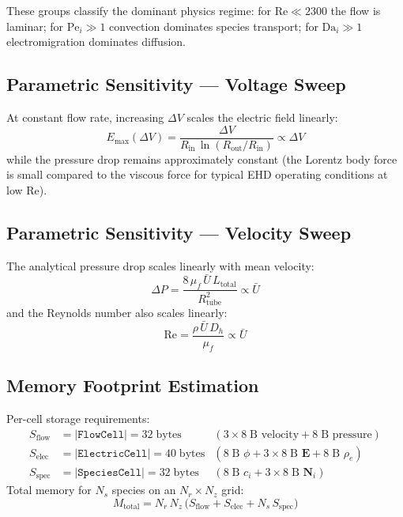 \documentclass[11pt,a4paper]{article}
\begin{document}
These groups classify the dominant physics regime: for $\mathrm{Re} \ll 2300$
the flow is laminar; for $\mathrm{Pe}_i \gg 1$ convection dominates species
transport; for $\mathrm{Da}_i \gg 1$ electromigration dominates diffusion.

\subsection{Parametric Sensitivity — Voltage Sweep}

At constant flow rate, increasing $\Delta V$ scales the electric field
linearly:
\begin{equation}\label{eq:E_vs_V}
  E_{\max}(\Delta V) = \frac{\Delta V}{R_{\mathrm{in}}\,
    \ln(R_{\mathrm{out}} / R_{\mathrm{in}})}
  \propto \Delta V
\end{equation}
while the pressure drop remains approximately constant (the Lorentz body
force is small compared to the viscous force for typical EHD operating
conditions at low $\mathrm{Re}$).

\subsection{Parametric Sensitivity — Velocity Sweep}

The analytical pressure drop scales linearly with mean velocity:
\begin{equation}\label{eq:dP_vs_U}
  \Delta P = \frac{8\,\mu_f\,\bar{U}\,L_{\mathrm{total}}}
                  {R_{\mathrm{tube}}^2}
  \propto \bar{U}
\end{equation}
and the Reynolds number also scales linearly:
\begin{equation}\label{eq:Re_vs_U}
  \mathrm{Re} = \frac{\rho\,\bar{U}\,D_h}{\mu_f} \propto \bar{U}
\end{equation}

\subsection{Memory Footprint Estimation}

Per-cell storage requirements:
\begin{align}
  S_{\mathrm{flow}} &= |\texttt{FlowCell}| = 32\;\text{bytes}
    & (3\times 8\;\text{B velocity} + 8\;\text{B pressure}) \\
  S_{\mathrm{elec}} &= |\texttt{ElectricCell}| = 40\;\text{bytes}
    & (8\;\text{B }\phi + 3\times 8\;\text{B }\bm{E} + 8\;\text{B }\rho_e) \\
  S_{\mathrm{spec}} &= |\texttt{SpeciesCell}| = 32\;\text{bytes}
    & (8\;\text{B }c_i + 3\times 8\;\text{B }\bm{N}_i)
\end{align}
Total memory for $N_s$ species on an $N_r \times N_z$ grid:
\begin{equation}\label{eq:memory}
  M_{\mathrm{total}} = N_r\,N_z\,\bigl(S_{\mathrm{flow}}
                      + S_{\mathrm{elec}}
                      + N_s\,S_{\mathrm{spec}}\bigr)
\end{equation}
\end{document}
